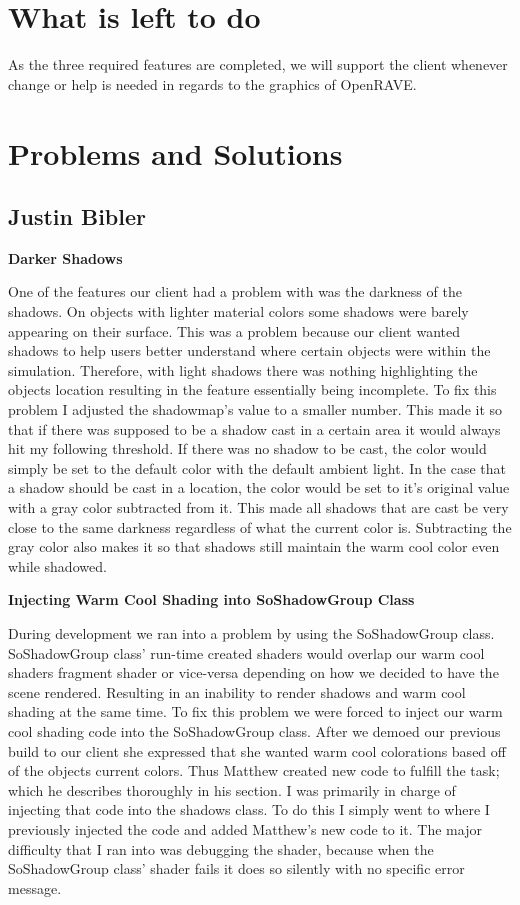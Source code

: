 \documentclass[10pt,journal,compsoc,draftclsnofoot]{IEEEtran}
\begin{document}
\begin{flushleft}
\section{What is left to do}
As the three required features are completed, we will support the client whenever change or help is needed in regards to the graphics of OpenRAVE.

\newpage

\section{Problems and Solutions}
\subsection{Justin Bibler}

\textbf{Darker Shadows}
\par
One of the features our client had a problem with was the darkness of the shadows.
On objects with lighter material colors some shadows were barely appearing on their surface.
This was a problem because our client wanted shadows to help users better understand where certain objects were within the simulation.
Therefore, with light shadows there was nothing highlighting the objects location resulting in the feature essentially being incomplete.
To fix this problem I adjusted the shadowmap's value to a smaller number.
This made it so that if there was supposed to be a shadow cast in a certain area it would always hit my following threshold.
If there was no shadow to be cast, the color would simply be set to the default color with the default ambient light.
In the case that a shadow should be cast in a location, the color would be set to it's original value with a gray color subtracted from it.
This made all shadows that are cast be very close to the same darkness regardless of what the current color is.
Subtracting the gray color also makes it so that shadows still maintain the warm cool color even while shadowed.
\vspace{3mm}

\textbf{Injecting Warm Cool Shading into SoShadowGroup Class}
\par
During development we ran into a problem by using the SoShadowGroup class.
SoShadowGroup class' run-time created shaders would overlap our warm cool shaders fragment shader or vice-versa depending on how we decided to have the scene rendered.
Resulting in an inability to render shadows and warm cool shading at the same time.
To fix this problem we were forced to inject our warm cool shading code into the SoShadowGroup class.
After we demoed our previous build to our client she expressed that she wanted warm cool colorations based off of the objects current colors.
Thus Matthew created new code to fulfill the task; which he describes thoroughly in his section.
I was primarily in charge of injecting that code into the shadows class.
To do this I simply went to where I previously injected the code and added Matthew's new code to it.
The major difficulty that I ran into was debugging the shader, because when the SoShadowGroup class' shader fails it does so silently with no specific error message.
\vspace{3mm}


\end{flushleft}
\end{document}
